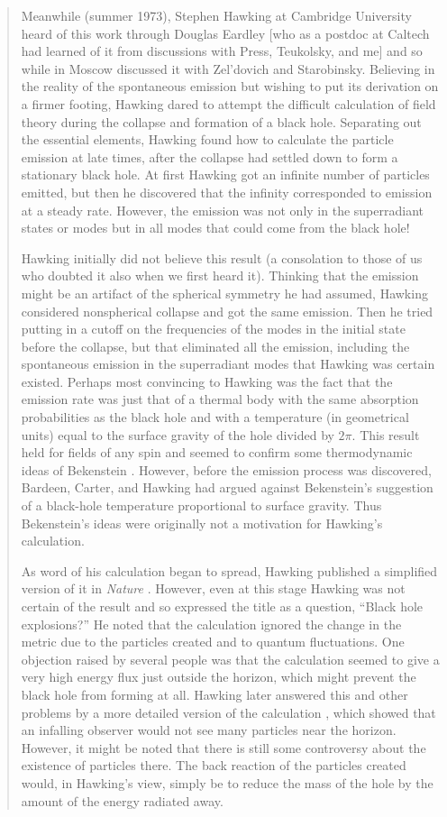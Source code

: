 \documentclass[12pt]{article} \usepackage{latexsym} \textwidth 15cm
\begin{document}
\begin{quotation}
Meanwhile (summer 1973), Stephen Hawking at Cambridge University heard
of this work through Douglas Eardley [who as a postdoc at Caltech had
learned of it from discussions with Press, Teukolsky, and me] and so
while in Moscow discussed it with Zel'dovich and Starobinsky.
Believing in the reality of the spontaneous emission but wishing to
put its derivation on a firmer footing, Hawking dared to attempt the
difficult calculation of field theory during the collapse and
formation of a black hole.  Separating out the essential elements,
Hawking found how to calculate the particle emission at late times,
after the collapse had settled down to form a stationary black hole.
At first Hawking got an infinite number of particles emitted, but then
he discovered that the infinity corresponded to emission at a steady
rate.  However, the emission was not only in the superradiant states
or modes but in all modes that could come from the black hole!

Hawking initially did not believe this result (a consolation to those
of us who doubted it also when we first heard it).  Thinking that the
emission might be an artifact of the spherical symmetry he had
assumed, Hawking considered nonspherical collapse and got the same
emission.  Then he tried putting in a cutoff on the frequencies of the
modes in the initial state before the collapse, but that eliminated
all the emission, including the spontaneous emission in the
superradiant modes that Hawking was certain existed.  Perhaps most
convincing to Hawking was the fact that the emission rate was just
that of a thermal body with the same absorption probabilities as the
black hole and with a temperature (in geometrical units) equal to the
surface gravity of the hole divided by $2\pi$.  This result held for
fields of any spin and seemed to confirm some thermodynamic ideas of
Bekenstein \cite{Bek3}.  However, before the emission process was
discovered, Bardeen, Carter, and Hawking \cite{BCH} had argued against
Bekenstein's suggestion of a black-hole temperature proportional to
surface gravity.  Thus Bekenstein's ideas were originally not a
motivation for Hawking's calculation.

As word of his calculation began to spread, Hawking published a
simplified version of it in \emph{Nature} \cite{Haw1}.  However, even
at this stage Hawking was not certain of the result and so expressed
the title as a question, ``Black hole explosions?''  He noted that the
calculation ignored the change in the metric due to the particles
created and to quantum fluctuations.  One objection raised by several
people was that the calculation seemed to give a very high energy flux
just outside the horizon, which might prevent the black hole from
forming at all.  Hawking later answered this and other problems by a
more detailed version of the calculation \cite{Haw2}, which showed
that an infalling observer would not see many particles near the
horizon.  However, it might be noted that there is still some
controversy about the existence of particles there.  The back reaction
of the particles created would, in Hawking's view, simply be to reduce
the mass of the hole by the amount of the energy radiated away.


\end{quotation}
\end{document}
